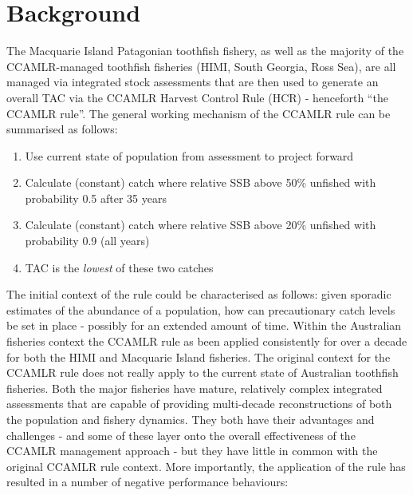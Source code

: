 \documentclass[12pt,a4paper,twoside,times,sky,standard]{csiroreport2017}
\begin{document}

\section{Background}

The Macquarie Island Patagonian toothfish fishery, as well as the majority of the CCAMLR-managed toothfish fisheries (HIMI, South Georgia, Ross Sea), are all managed via integrated stock assessments that are then used to generate an overall TAC via the CCAMLR Harvest Control Rule (HCR) - henceforth ``the CCAMLR rule''. The general working mechanism of the CCAMLR rule can be summarised as follows:

\begin{enumerate}
    \item Use current state of population from assessment to project forward
    \item Calculate (constant) catch where relative SSB above 50\% unfished with probability 0.5 after 35 years
    \item Calculate (constant) catch where relative SSB above 20\% unfished with probability 0.9 (all years)
    \item TAC is the \emph{lowest} of these two catches
\end{enumerate}

The initial context of the rule could be characterised as follows: given sporadic estimates of the abundance of a population, how can precautionary catch levels be set in place - possibly for an extended amount of time. Within the Australian fisheries context the CCAMLR rule as been applied consistently for over a decade for both the HIMI and Macquarie Island fisheries. The original context for the CCAMLR rule does not really apply to the current state of Australian toothfish fisheries. Both the major fisheries have mature, relatively complex integrated assessments that are capable of providing multi-decade reconstructions of both the population and fishery dynamics. They both have their advantages and challenges - and some of these layer onto the overall effectiveness of the CCAMLR management approach - but they have little in common with the original CCAMLR rule context. More importantly, the application of the rule has resulted in a number of negative performance behaviours:
\end{document}
